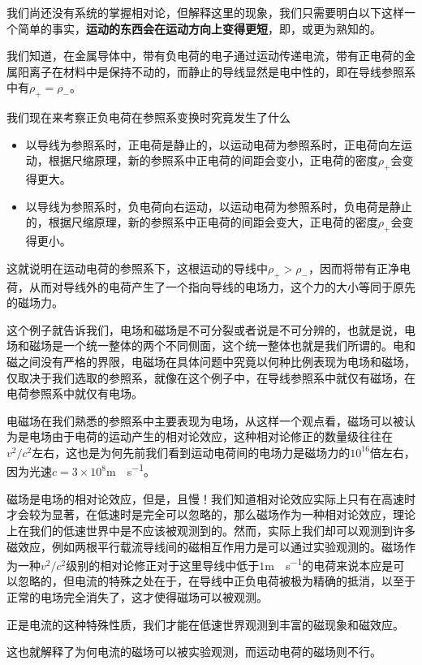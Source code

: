 我们尚还没有系统的掌握相对论，但解释这里的现象，我们只需要明白以下这样一个简单的事实，\textbf{运动的东西会在运动方向上变得更短}，即，或更为熟知的。

我们知道，在金属导体中，带有负电荷的电子通过运动传递电流，带有正电荷的金属阳离子在材料中是保持不动的，而静止的导线显然是电中性的，即在导线参照系中有$\rho_{+}=\rho_{-}$。

我们现在来考察正负电荷在参照系变换时究竟发生了什么
\begin{itemize}
    \item 以导线为参照系时，正电荷是静止的，以运动电荷为参照系时，正电荷向左运动，根据尺缩原理，新的参照系中正电荷的间距会变小，正电荷的密度$\rho_{+}$会变得更大。
    \item 以导线为参照系时，负电荷向右运动，以运动电荷为参照系时，负电荷是静止的，根据尺缩原理，新的参照系中正电荷的间距会变大，正电荷的密度$\rho_{+}$会变得更小。
\end{itemize}
这就说明在运动电荷的参照系下，这根运动的导线中$\rho_{+}>\rho_{-}$，因而将带有正净电荷，从而对导线外的电荷产生了一个指向导线的电场力，这个力的大小等同于原先的磁场力。

这个例子就告诉我们，电场和磁场是不可分裂或者说是不可分辨的，也就是说，电场和磁场是一个统一整体的两个不同侧面，这个统一整体也就是我们所谓的。电和磁之间没有严格的界限，电磁场在具体问题中究竟以何种比例表现为电场和磁场，仅取决于我们选取的参照系，就像在这个例子中，在导线参照系中就仅有磁场，在电荷参照系中就仅有电场。

电磁场在我们熟悉的参照系中主要表现为电场，从这样一个观点看，磁场可以被认为是电场由于电荷的运动产生的相对论效应，这种相对论修正的数量级往往在$v^2/c^2$左右，这也是为何先前我们看到运动电荷间的电场力是磁场力的$10^{16}$倍左右，因为光速$c=3\times 10^8$\si{m\cdot s^{-1}}。

磁场是电场的相对论效应，但是，且慢！我们知道相对论效应实际上只有在高速时才会较为显著，在低速时是完全可以忽略的，那么磁场作为一种相对论效应，理论上在我们的低速世界中是不应该被观测到的。然而，实际上我们却可以观测到许多磁效应，例如两根平行载流导线间的磁相互作用力是可以通过实验观测的。磁场作为一种$v^2/c^2$级别的相对论修正对于这里导线中低于$1$\si{m\cdot s^{-1}}的电荷来说本应是可以忽略的，但电流的特殊之处在于，在导线中正负电荷被极为精确的抵消，以至于正常的电场完全消失了，这才使得磁场可以被观测。
\begin{center}
    \small 
    正是电流的这种特殊性质，我们才能在低速世界观测到丰富的磁现象和磁效应。
\end{center}
这也就解释了为何电流的磁场可以被实验观测，而运动电荷的磁场则不行。

